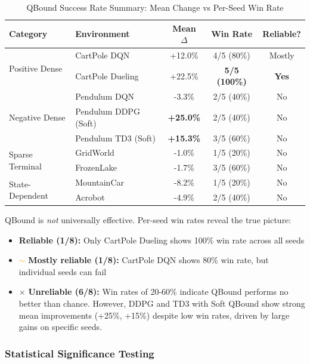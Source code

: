 \documentclass[11pt]{article}
\theoremstyle{definition}
\theoremstyle{remark}
\begin{document}
\begin{table}[h]
\centering
\caption{QBound Success Rate Summary: Mean Change vs Per-Seed Win Rate}
\label{tab:overall-success}
\begin{tabular}{llccc}
\toprule
\textbf{Category} & \textbf{Environment} & \textbf{Mean $\Delta$} & \textbf{Win Rate} & \textbf{Reliable?} \\
\midrule
\multirow{2}{*}{Positive Dense} & CartPole DQN & +12.0\% & 4/5 (80\%) & Mostly \\
& CartPole Dueling & +22.5\% & \textbf{5/5 (100\%)} & \textbf{Yes} \\
\midrule
\multirow{3}{*}{Negative Dense} & Pendulum DQN & -3.3\% & 2/5 (40\%) & No \\
& Pendulum DDPG (Soft) & \textbf{+25.0\%} & 2/5 (40\%) & No \\
& Pendulum TD3 (Soft) & \textbf{+15.3\%} & 3/5 (60\%) & No \\
\midrule
\multirow{2}{*}{Sparse Terminal} & GridWorld & -1.0\% & 1/5 (20\%) & No \\
& FrozenLake & -1.7\% & 3/5 (60\%) & No \\
\midrule
\multirow{2}{*}{State-Dependent} & MountainCar & -8.2\% & 1/5 (20\%) & No \\
& Acrobot & -4.9\% & 2/5 (40\%) & No \\
\bottomrule
\end{tabular}
\end{table}

 QBound is \textit{not} universally effective. Per-seed win rates reveal the true picture:
\begin{itemize}
    \item \checkmark \textbf{Reliable (1/8):} Only CartPole Dueling shows 100\% win rate across all seeds
    \item \textcolor{orange}{$\sim$} \textbf{Mostly reliable (1/8):} CartPole DQN shows 80\% win rate, but individual seeds can fail
    \item $\times$ \textbf{Unreliable (6/8):} Win rates of 20-60\% indicate QBound performs no better than chance. However, DDPG and TD3 with Soft QBound show strong mean improvements (+25\%, +15\%) despite low win rates, driven by large gains on specific seeds.
\end{itemize}

\subsubsection{Statistical Significance Testing}
\end{document}
